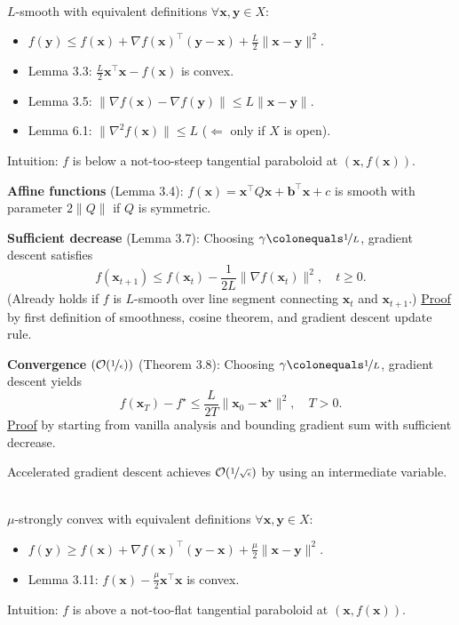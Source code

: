 \documentclass{article}
\renewcommand{\vec}[1]{\mathbf{#1}}
\newcommand{\mat}[1]{#1}
\newcommand{\transpose}[1]{#1^\top}
\newenvironment{topic}[1]
{\textbf{\sffamily \colorbox{black}{\rlap{\textbf{\textcolor{white}{#1}}}\hspace{\linewidth}\hspace{-2\fboxsep}}} \\ \vspace{0.2cm}}
{}
\begin{document}
\begin{multicols*}{2}
    \begin{topic}{3 Smooth functions}
        $L$-smooth with equivalent definitions $\forall \vec{x}, \vec{y} \in X$:
        \begin{itemize}
            \item $f(\vec{y}) \leq f(\vec{x}) + \transpose{\nabla f(\vec{x})} (\vec{y} - \vec{x}) + \frac{L}{2} \| \vec{x} - \vec{y} \|^2$.
            \item Lemma 3.3: $\frac{L}{2} \transpose{\vec{x}} \vec{x} - f(\vec{x})$ is convex.
            \item Lemma 3.5: $\| \nabla f(\vec{x}) - \nabla f(\vec{y}) \| \leq L \| \vec{x} - \vec{y} \|$.
            \item Lemma 6.1: $\| \nabla^2 f(\vec{x}) \| \leq L$ ($\Leftarrow$ only if $X$ is open).
        \end{itemize}
        Intuition: $f$ is below a not-too-steep tangential paraboloid at $(\vec{x}, f(\vec{x}))$.

        \textbf{Affine functions} (Lemma 3.4): $f(\vec{x}) = \transpose{\vec{x}} \mat{Q} \vec{x} +
            \transpose{\vec{b}} \vec{x} + c$ is smooth with parameter $2 \| \mat{Q} \|$ if $\mat{Q}$ is
        symmetric.

        \textbf{Sufficient decrease} (Lemma 3.7): Choosing $\gamma \colonequals \nicefrac{1}{L}$, gradient descent satisfies \[
            f(\vec{x}_{t+1}) \leq f(\vec{x}_t) - \frac{1}{2L} \| \nabla f(\vec{x}_t) \|^2, \quad t \geq 0.
        \]
        (Already holds if $f$ is $L$-smooth over line segment connecting $\vec{x}_t$ and $\vec{x}_{t+1}$.)
        \underline{Proof} by first definition of smoothness, cosine theorem, and gradient descent update rule.

        \textbf{Convergence} $(\mathcal{O}(\nicefrac{1}{\epsilon}))$ (Theorem 3.8): Choosing $\gamma \colonequals \nicefrac{1}{L}$, gradient descent yields \[
            f(\vec{x}_T) - f^\star \leq \frac{L}{2T} \| \vec{x}_0 - \vec{x}^\star \|^2, \quad T > 0.
        \]
        \underline{Proof} by starting from vanilla analysis and bounding gradient sum with sufficient decrease.

        Accelerated gradient descent achieves $\mathcal{O}(\nicefrac{1}{\sqrt{\epsilon}})$ by using an
        intermediate variable.
    \end{topic}

    \begin{topic}{3 Strongly convex functions}
        $\mu$-strongly convex with equivalent definitions $\forall \vec{x}, \vec{y} \in X$:
        \begin{itemize}
            \item $f(\vec{y}) \geq f(\vec{x}) + \transpose{\nabla f(\vec{x})} (\vec{y} - \vec{x}) + \frac{\mu}{2} \| \vec{x} - \vec{y} \|^2$.
            \item Lemma 3.11: $f(\vec{x}) - \frac{\mu}{2} \transpose{\vec{x}} \vec{x}$ is convex.
        \end{itemize}
        Intuition: $f$ is above a not-too-flat tangential paraboloid at $(\vec{x}, f(\vec{x}))$.


\end{topic}
\end{multicols*}
\end{document}

